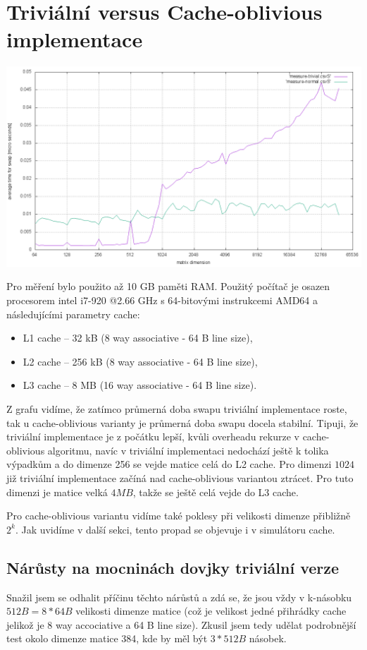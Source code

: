 \documentclass[12pt,a4paper]{report}
\begin{document}
\section{Triviální versus Cache-oblivious implementace}
\includegraphics[width=\textwidth]{./tests/graph1.png}

Pro měření bylo použito až 10 GB paměti RAM.
Použitý počítač je osazen procesorem intel i7-920 @2.66 GHz
s 64-bitovými instrukcemi AMD64 a následujícími parametry cache:
\begin{itemize}
	\item L1 cache -- 32 kB (8 way associative - 64 B line size),
	\item L2 cache -- 256 kB (8 way associative - 64 B line size),
	\item L3 cache -- 8 MB (16 way associative - 64 B line size).
\end{itemize}

Z grafu vidíme, že zatímco průmerná doba swapu triviální implementace roste, 
tak u cache-oblivious varianty je průmerná doba swapu docela stabilní. Tipuji, že
triviální implementace je z počátku lepší, kvůli overheadu rekurze v cache-oblivious
algoritmu, navíc v triviální implementaci nedochází ještě k tolika výpadkům a do
dimenze 256 se vejde matice celá do L2 cache.
Pro dimenzi $1024$ již triviální implementace začíná nad cache-oblivious variantou
ztrácet. Pro tuto dimenzi je matice velká $4 MB$, takže se ještě celá vejde do L3 cache.

Pro cache-oblivious variantu vidíme také poklesy při velikosti dimenze přibližně $2^k$.
Jak uvidíme v další sekci, tento propad se objevuje i v simulátoru cache.

\subsection{Nárůsty na mocninách dovjky triviální verze}
Snažil jsem se odhalit příčinu těchto nárůstů a zdá se, že jsou vždy v k-násobku $512 B = 8 * 64 B$ velikosti dimenze matice
(což je velikost jedné přihrádky cache jelikož je 8 way accociative a 64 B line size).
Zkusil jsem tedy udělat podrobnější test okolo dimenze matice 384, kde by měl být $3 * 512 B$ násobek.
\end{document}
